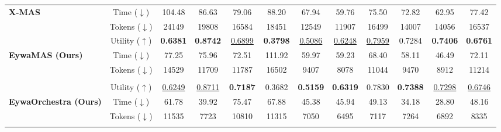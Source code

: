\begin{table}[!t]
{\begin{tabular}{l|c|ccc|ccc|ccc|c}
        \cellcolor{blue!7}\textbf{X-MAS \citeyearpar{DBLP:journals/corr/abs-2505-16997}}
        & Time ($\downarrow$)  & 104.48 & 86.63 & 79.06 & 88.20 & 67.94 & 59.76 & 75.50 & 72.82 & 62.95 & 77.42\\
        \cellcolor{blue!7}
        & Tokens ($\downarrow$) & 24149 & 19808 & 16584 & 18451 & 12549 & 11907 & 16499 & 14007 & 14056 & 16537\\
        [-0.4ex]\bottomrule
        \cellcolor{violet!7}
        & Utility ($\uparrow$)   & \textbf{0.6381} & \textbf{0.8742} & \underline{0.6899} & \textbf{0.3798} & \underline{0.5086} & \underline{0.6248} & \underline{0.7959} & 0.7284 & \textbf{0.7406} & \textbf{0.6761}\\
        \cellcolor{violet!7}\textbf{EywaMAS (Ours)}
        & Time ($\downarrow$)  & 77.25 & 75.96 & 72.51 & 111.92 & 59.97 & 59.23 & 68.40 & 58.11 & 46.49 & 72.11\\
        \cellcolor{violet!7}
        & Tokens ($\downarrow$) & 14529 & 11709 & 11787 & 16502 & 9407 & 8078 & 11044 & 9470 & 8912 & 11214\\

        \addlinespace[-0.4ex] \midrule \addlinespace[-0.000ex]
        \rowcolor{gray!16}
        \multicolumn{12}{c}{
            \rule{0pt}{1.1em}
            \textbf{\textit{Dynamic Orchestration}}
            \rule[-0.3em]{0pt}{1.1em}
        } \\
        [-0.4ex]\midrule\addlinespace[-0.000ex]
        \cellcolor{pink!7}
            & Utility ($\uparrow$)   & \underline{0.6249} & \underline{0.8711} & \textbf{0.7187} & 0.3682 & \textbf{0.5159} & \textbf{0.6319} & 0.7830 & \textbf{0.7388} & \underline{0.7298} & \underline{0.6746}\\
        \cellcolor{pink!7}\textbf{EywaOrchestra (Ours)}
            & Time ($\downarrow$)  & 61.78 & 39.92 & 75.47 & 67.88 & 45.38 & 45.94 & 49.13 & 34.18 & 28.80 & 48.16\\
        \cellcolor{pink!7}
            & Tokens ($\downarrow$) & 11535 & 7723 & 10810 & 11315 & 7050 & 6495 & 7117 & 7264 & 6892 & 8335\\
        [-0.4ex]\bottomrule\addlinespace[-0.000ex]
    \end{tabular}
    }
\end{table}

